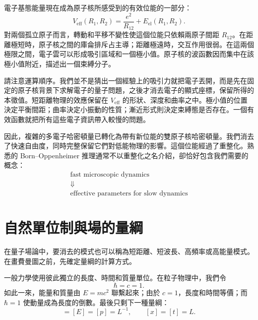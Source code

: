 \begin{classroomqa}
\end{classroomqa}

電子基態能量現在成為原子核所感受到的有效位能的一部分：
\begin{equation}
V_{\mathrm{eff}}(R_1,R_2)
=\frac{e^2}{R_{12}}+E_{\mathrm{el}}(R_1,R_2).
\label{eq:molecular-effective-potential}
\end{equation}
對兩個孤立原子而言，轉動和平移不變性使這個位能只依賴兩原子間距 \(R_{12}\)。在距離極短時，原子核之間的庫侖排斥占主導；距離極遠時，交互作用很弱。在這兩個極限之間，電子雲可以形成吸引區域和一個極小值。原子核的波函數因而集中在該極小值附近，描述出一個束縛分子。

請注意運算順序。我們並不是猜出一個經驗上的吸引力就把電子丟開，而是先在固定的原子核背景下求解電子的量子問題，之後才消去電子的顯式座標，保留所得的本徵值。短距離物理的效應保留在 \(V_{\mathrm{eff}}\) 的形狀、深度和曲率之中。極小值的位置決定平衡間距；曲率決定小振動的性質；漸近形式則決定束縛態是否存在。一個有效函數就把所有這些電子資訊帶入較慢的問題。

因此，複雜的多電子哈密頓量已轉化為帶有新位能的雙原子核哈密頓量。我們消去了快速自由度，同時完整保留它們對低能物理的影響。這個位能經過了重整化。熟悉的 Born--Oppenheimer 推理通常不以重整化之名介紹，卻恰好包含我們需要的概念：
\begin{equation}
\begin{gathered}
\text{fast microscopic dynamics}\\
\Downarrow\\
\text{effective parameters for slow dynamics}
\end{gathered}
\end{equation}

\section{自然單位制與場的量綱}

在量子場論中，要消去的模式也可以稱為短距離、短波長、高頻率或高能量模式。在畫費曼圖之前，先確定量綱的計算方式。

一般力學使用彼此獨立的長度、時間和質量單位。在粒子物理中，我們令
\begin{equation}
\hbar=c=1.
\end{equation}
如此一來，能量和質量由 \(E=mc^2\) 聯繫起來；由於 \(c=1\)，長度和時間等價；而 \(\hbar=1\) 使動量成為長度的倒數。最後只剩下一種量綱：
\begin{equation}
[M]=[E]=[p]=L^{-1},
\qquad
[x]=[t]=L.
\label{eq:natural-units}
\end{equation}

